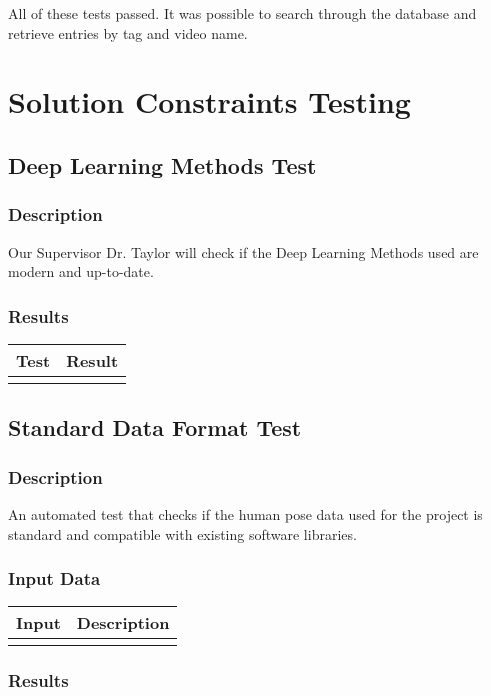 \documentclass{scrreprt}
\begin{document}
All of these tests passed. It was possible to search through the database and
retrieve entries by tag and video name.

\section{Solution Constraints Testing}

\subsection{Deep Learning Methods Test}
\subsubsection{Description}
Our Supervisor Dr. Taylor will check if the Deep Learning Methods used are modern and up-to-date.
\subsubsection{Results}
 \centering
 \begin{tabular}{||p{2.5cm}|p{2.5cm}||}
 \hline
 \bf Test & \bf Result\\
 \hline\hline
   &  \\ %
 \hline
 \end{tabular}

\subsection{Standard Data Format Test}
\subsubsection{Description}
An automated test that checks if the human pose data used for the project is standard and compatible with existing software libraries.
\subsubsection{Input Data}
 \centering
 \begin{tabular}{p{3cm}p{6cm}}
 \hline\hline
 Input & Description\\
 \hline\hline
   &  \\ %
 \hline
 \end{tabular}
\subsubsection{Results}
\end{document}
